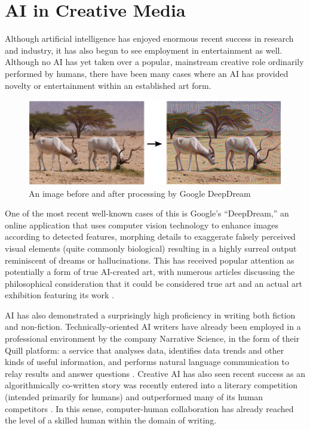 \documentclass[ author={Stephen Livermore-Tozer},
				supervisor={Dr. Peter Flach},
				degree={MEng},
				title={Performing Algorithmic Co-composition Using Machine Learning},
				subtitle={},
				type={research},
				year={2016} ]{dissertation}
\begin{document}
	
	\section{AI in Creative Media}
	
	Although artificial intelligence has enjoyed enormous recent success in research and industry, it has also begun to see employment in entertainment as well. Although no AI has yet taken over a popular, mainstream creative role ordinarily performed by humans, there have been many cases where an AI has provided novelty or entertainment within an established art form.
	
	\begin{figure}[h]
		\centering
		\includegraphics[width=1.0\textwidth]{deep-dream-example}
		\caption{An image before and after processing by Google DeepDream}
	\end{figure}
	
	One of the most recent well-known cases of this is Google's ``DeepDream,'' an online application that uses computer vision technology to enhance images according to detected features, morphing details to exaggerate falsely perceived visual elements (quite commonly biological) resulting in a highly surreal output reminiscent of dreams or hallucinations. This has received popular attention as potentially a form of true AI-created art, with numerous articles discussing the philosophical consideration that it could be considered true art \cite{rayner2016google} \cite{galperina2015google} and an actual art exhibition featuring its work \cite{campbell2016inside}.
	
	AI has also demonstrated a surprisingly high proficiency in writing both fiction and non-fiction. Technically-oriented AI writers have already been employed in a professional environment by the company Narrative Science, in the form of their Quill platform: a service that analyses data, identifies data trends and other kinds of useful information, and performs natural language communication to relay results and answer questions \cite{woodie2016big}. Creative AI has also seen recent success as an algorithmically co-written story was recently entered into a literary competition (intended primarily for humans) and outperformed many of its human competitors \cite{tarantola2016ai}. In this sense, computer-human collaboration has already reached the level of a skilled human within the domain of writing. 
	
\end{document}

